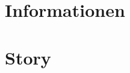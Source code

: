 \documentclass{./include/pnp}
\begin{document}
	\FrontMatter

	

	\TableOfContents

	\MainMatter

	\chapter{Informationen}
	
	\newpage
	

	\newpage
	\chapter{Story}
	
\end{document}
